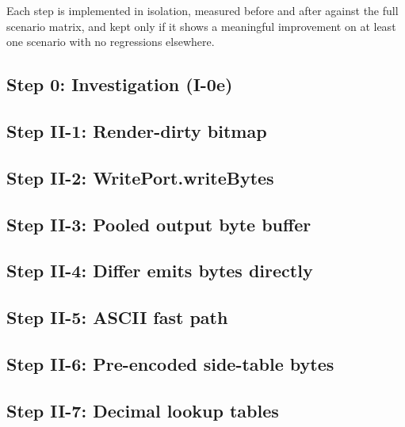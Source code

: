 Each step is implemented in isolation, measured before and after against the full scenario matrix, and kept only if it shows a meaningful improvement on at least one scenario with no regressions elsewhere.

\subsection{Step 0: Investigation (I-0e)}\label{record-422-step-0-investigation-i-0e}

\subsection{Step II-1: Render-dirty bitmap}\label{record-422-step-ii-1-render-dirty-bitmap}

\subsection{Step II-2: WritePort.writeBytes}\label{record-422-step-ii-2-writeport.writebytes}

\subsection{Step II-3: Pooled output byte buffer}\label{record-422-step-ii-3-pooled-output-byte-buffer}

\subsection{Step II-4: Differ emits bytes directly}\label{record-422-step-ii-4-differ-emits-bytes-directly}

\subsection{Step II-5: ASCII fast path}\label{record-422-step-ii-5-ascii-fast-path}

\subsection{Step II-6: Pre-encoded side-table bytes}\label{record-422-step-ii-6-pre-encoded-side-table-bytes}

\subsection{Step II-7: Decimal lookup tables}\label{record-422-step-ii-7-decimal-lookup-tables}

